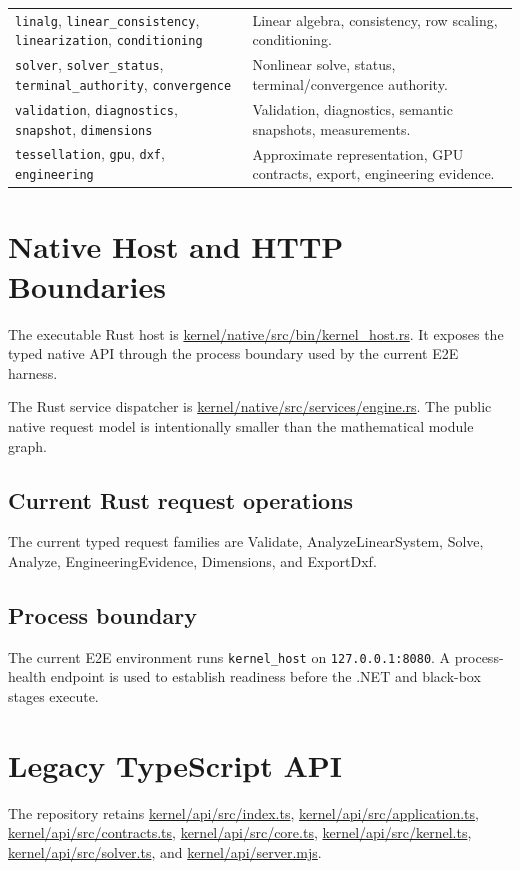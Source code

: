 \documentclass[11pt,a4paper]{report}
\newcommand{\pathref}[1]{\url{#1}}
\begin{document}
\begin{longtable}{@{}p{}p{}@{}}
\texttt{linalg}, \texttt{linear\_consistency}, \texttt{linearization}, \texttt{conditioning} & Linear algebra, consistency, row scaling, conditioning. \\
\texttt{solver}, \texttt{solver\_status}, \texttt{terminal\_authority}, \texttt{convergence} & Nonlinear solve, status, terminal/convergence authority. \\
\texttt{validation}, \texttt{diagnostics}, \texttt{snapshot}, \texttt{dimensions} & Validation, diagnostics, semantic snapshots, measurements. \\
\texttt{tessellation}, \texttt{gpu}, \texttt{dxf}, \texttt{engineering} & Approximate representation, GPU contracts, export, engineering evidence. \\
\bottomrule
\end{longtable}

\chapter{Native Host and HTTP Boundaries}

The executable Rust host is \pathref{kernel/native/src/bin/kernel_host.rs}. It exposes the typed native API through the process boundary used by the current E2E harness.

The Rust service dispatcher is \pathref{kernel/native/src/services/engine.rs}. The public native request model is intentionally smaller than the mathematical module graph.

\section{Current Rust request operations}
The current typed request families are Validate, AnalyzeLinearSystem, Solve, Analyze, EngineeringEvidence, Dimensions, and ExportDxf.

\section{Process boundary}
The current E2E environment runs \texttt{kernel\_host} on \texttt{127.0.0.1:8080}. A process-health endpoint is used to establish readiness before the .NET and black-box stages execute.

\chapter{Legacy TypeScript API}

The repository retains \pathref{kernel/api/src/index.ts}, \pathref{kernel/api/src/application.ts}, \pathref{kernel/api/src/contracts.ts}, \pathref{kernel/api/src/core.ts}, \pathref{kernel/api/src/kernel.ts}, \pathref{kernel/api/src/solver.ts}, and \pathref{kernel/api/server.mjs}.
\end{document}
